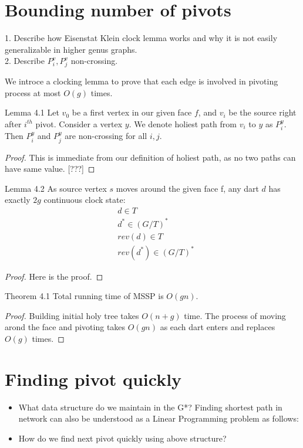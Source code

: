 \documentclass{article}
\begin{document}
\section{Bounding number of pivots}

\begin{center}
{\color{red}
1. Describe how Eisenstat Klein clock lemma works and why it is not easily
generalizable in higher genus graphs. 
\\
2. Describe $P_i^{v}, P_j^{v}$ non-crossing.}
\end{center}

We introce a clocking lemma to prove that each edge is involved in pivoting 
process at most $O(g)$ times.

\begin{oneshot}{Lemma 4.1}
Let $v_0$ be a first vertex in our given face $f$, and $v_i$ be the source right
after $i^{th}$ pivot. Consider a vertex $y$. We denote holiest path from 
$v_i$ to $y$ as $P_i^{y}$. Then $P_i^{y}$ and $P_j^{y}$ are non-crossing for 
all $i, j$.
\end{oneshot}
\begin{proof}
This is immediate from our definition of holiest path, as no two paths can have
same value. {\color{red} [???]}
\end{proof}

\begin{oneshot}{Lemma 4.2}
As source vertex $s$ moves around the given face f, any dart $d$ has exactly
$2g$ continuous clock state: 
\begin{align}
& d \in T \\
& d^{*} \in (G/T)^{*} \\
& rev(d) \in T \\
& rev(d^{*}) \in (G/T)^{*}
\end{align}
\end{oneshot}
\begin{proof}
Here is the proof.
\end{proof}


\begin{oneshot}{Theorem 4.1}
Total running time of MSSP is $O(gn)$.
\end{oneshot}
\begin{proof}
Building initial holy tree takes $O(n + g)$ time. The process of moving arond the
face and pivoting takes $O(gn)$ as each dart enters and replaces $O(g)$ times.
\end{proof}

\section{Finding pivot quickly}
\begin{itemize}
\item What data structure do we maintain in the G*?
Finding shortest path in network can also be understood as a Linear Programming 
problem as follows:
\item How do we find next pivot quickly using above structure?
\end{itemize}
\end{document}
